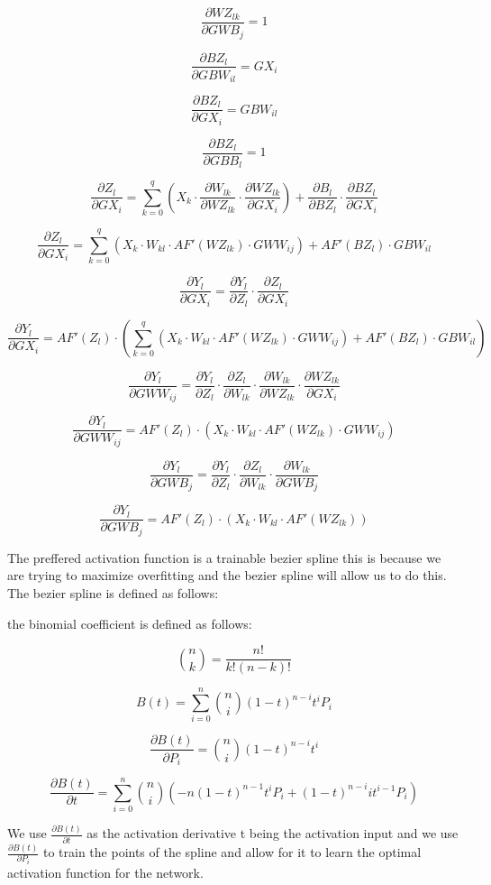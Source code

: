\documentclass[a4paper]{article}
\begin{document}
	\[
	\frac{\partial WZ_{lk}}{\partial GWB_{j}} = 1
	\]

	\[
	\frac{\partial BZ_{l}}{\partial GBW_{il}} = GX_i
	\]

	\[
	\frac{\partial BZ_{l}}{\partial GX_i} = GBW_{il}
	\]

	\[
	\frac{\partial BZ_{l}}{\partial GBB_{l}} = 1
	\]

	\[
	\frac{\partial Z_l}{\partial GX_i} = \sum_{k=0}^{q}\left(X_k \cdot \frac{\partial W_{lk}}{\partial WZ_{lk}} \cdot \frac{\partial WZ_{lk}}{\partial GX_i}\right) + \frac{\partial B_{l}}{\partial BZ_{l}} \cdot \frac{\partial BZ_{l}}{\partial GX_i}
	\]

	\[
	\frac{\partial Z_l}{\partial GX_i} = \sum_{k=0}^{q}\left(X_k \cdot W_{kl} \cdot AF'(WZ_{lk}) \cdot GWW_{ij}\right) + AF'(BZ_{l}) \cdot GBW_{il}
	\]

	\[
	\frac{\partial Y_l}{\partial GX_i} = \frac{\partial Y_l}{\partial Z_l} \cdot \frac{\partial Z_l}{\partial GX_i}
	\]

	\[
	\frac{\partial Y_l}{\partial GX_i} = AF'(Z_l) \cdot \left(\sum_{k=0}^{q}\left(X_k \cdot W_{kl} \cdot AF'(WZ_{lk}) \cdot GWW_{ij}\right) + AF'(BZ_{l}) \cdot GBW_{il}\right)
	\]

	\[
	\frac{\partial Y_l}{\partial GWW_{ij}} = \frac{\partial Y_l}{\partial Z_l} \cdot \frac{\partial Z_l}{\partial W_{lk}} \cdot \frac{\partial W_{lk}}{\partial WZ_{lk}} \cdot \frac{\partial WZ_{lk}}{\partial GX_i}
	\]

	\[
	\frac{\partial Y_l}{\partial GWW_{ij}} = AF'(Z_l) \cdot \left(X_k \cdot W_{kl} \cdot AF'(WZ_{lk}) \cdot GWW_{ij}\right)
	\]

	\[
	\frac{\partial Y_l}{\partial GWB_{j}} = \frac{\partial Y_l}{\partial Z_l} \cdot \frac{\partial Z_l}{\partial W_{lk}} \cdot \frac{\partial W_{lk}}{\partial GWB_{j}}
	\]

	\[
	\frac{\partial Y_l}{\partial GWB_{j}} = AF'(Z_l) \cdot \left(X_k \cdot W_{kl} \cdot AF'(WZ_{lk})\right)
	\]
	
	The preffered activation function is a trainable bezier spline this is because we are trying to maximize overfitting and the bezier spline will allow us to do this. The bezier spline is defined as follows:

	the binomial coefficient is defined as follows:
	
	\[
		\binom{n}{k} = \frac{n!}{k!(n-k)!}
	\]

	\[
		B(t) = \sum_{i=0}^{n} \binom{n}{i} (1-t)^{n-i} t^i P_i
	\]

	\[
		\frac{\partial B(t)}{\partial P_i} = \binom{n}{i} (1-t)^{n-i} t^i
	\]

	\[
		\frac{\partial B(t)}{\partial t} = \sum_{i=0}^{n} \binom{n}{i} \left( -n(1-t)^{n-1} t^i P_i + (1-t)^{n-i} i t^{i-1} P_i \right)
	\]

	We use $\frac{\partial B(t)}{\partial t}$ as the activation derivative t being the activation input and we use $\frac{\partial B(t)}{\partial P_i}$ to train the points of the spline and allow for it to learn the optimal activation function for the network.
\end{document}
